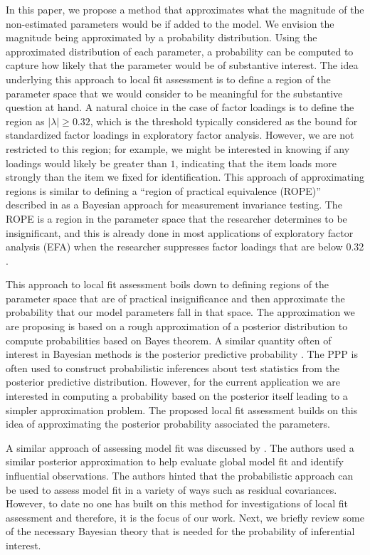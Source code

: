 \documentclass[noextraspace, floatsintext, 12pt]{apa7}
\begin{document}
In this paper, we propose a method that approximates what the magnitude of the non-estimated parameters would be if added to the model. 
We envision the magnitude being approximated by a probability distribution. 
Using the approximated distribution of each parameter, a probability can be computed to capture how likely that the parameter would be of substantive interest.
The idea underlying this approach to local fit assessment is to define a region of the parameter space that we would consider to be meaningful for the substantive question at hand. 
A natural choice in the case of factor loadings is to define the region as $\vert \lambda \vert \geq 0.32$, which is the threshold typically considered as the bound for standardized factor loadings in exploratory factor analysis.
However, we are not restricted to this region; for example, we might be interested in knowing if any loadings would likely be greater than $1$, indicating that the item loads more strongly than the item we fixed for identification.
This approach of approximating regions is similar to defining a ``region of practical equivalence (ROPE)'' described in \textcite{Shi2019} as a Bayesian approach for measurement invariance testing.
The ROPE is a region in the parameter space that the researcher determines to be insignificant, and this is already done in most applications of exploratory factor analysis (EFA) when the researcher suppresses factor loadings that are below 0.32 \citep{Benson1998}.

This approach to local fit assessment boils down to defining regions of the parameter space that are of practical insignificance and then approximate the probability that our model parameters fall in that space.
The approximation we are proposing is based on a rough approximation of a posterior distribution to compute probabilities based on Bayes theorem.
A similar quantity often of interest in Bayesian methods is the posterior predictive probability \citep[PPP or $p$-value, ][]{Gelman1996, Rubin1996}.
The PPP is often used to construct probabilistic inferences about test statistics from the posterior predictive distribution.
However, for the current application we are interested in computing a probability based on the posterior itself leading to a simpler approximation problem.
The proposed local fit assessment builds on this idea of approximating the posterior probability associated the parameters.
 
A similar approach of assessing model fit was discussed by \textcite{Lee2016}.
The authors used a similar posterior approximation to help evaluate global model fit and identify influential observations.
The authors hinted that the probabilistic approach can be used to assess model fit in a variety of ways such as residual covariances.
However, to date no one has built on this method for investigations of local fit assessment and therefore, it is the focus of our work.
Next, we briefly review some of the necessary Bayesian theory that is needed for the probability of inferential interest.
\end{document}
